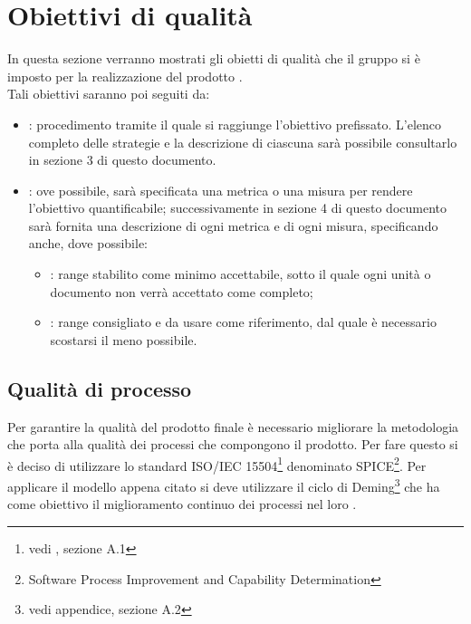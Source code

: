 \newpage
\section{Obiettivi di qualità}%
\label{2.1}
In questa sezione verranno mostrati gli obietti di qualità che il gruppo si è imposto per la realizzazione del prodotto \Progetto{}. \\
Tali obiettivi saranno poi seguiti da:
\begin{itemize}
\item {}: procedimento tramite il quale si raggiunge l'obiettivo prefissato. L'elenco completo delle strategie e la descrizione di ciascuna sarà possibile consultarlo in sezione 3 di questo documento.
\item {}: ove possibile, sarà specificata una metrica o una misura per rendere l'obiettivo quantificabile; successivamente in sezione 4 di questo documento sarà fornita una descrizione di ogni metrica e di ogni misura, specificando anche, dove possibile:
\begin{itemize}
\item {}: range stabilito come minimo accettabile, sotto il quale ogni unità o documento non verrà accettato come completo;
\item {}: range consigliato e da usare come riferimento, dal quale è necessario scostarsi il meno possibile.
\end{itemize}
\end{itemize}
\subsection{Qualità di processo} %
\label{2.1.1}
Per garantire la qualità del prodotto finale è necessario migliorare la metodologia che porta alla qualità dei processi che compongono il prodotto. Per fare questo si è deciso di utilizzare lo standard ISO/IEC 15504\footnote{vedi , sezione A.1} denominato SPICE\footnote{Software Process Improvement and Capability Determination}.
Per applicare il modello appena citato si deve utilizzare il ciclo di Deming\footnote{vedi appendice, sezione A.2} che ha come obiettivo il miglioramento continuo dei processi nel loro .
